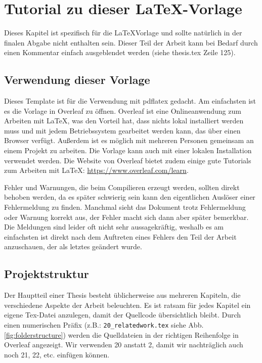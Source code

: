 \chapter{Tutorial zu dieser LaTeX-Vorlage}
Dieses Kapitel ist spezifisch für die \LaTeX Vorlage und sollte natürlich in der finalen Abgabe nicht enthalten sein.
Dieser Teil der Arbeit kann bei Bedarf durch einen Kommentar einfach ausgeblendet werden (siehe thesis.tex Zeile 125).






\section{Verwendung dieser Vorlage}
Dieses Template ist für die Verwendung mit pdflatex gedacht. Am einfachsten ist es die Vorlage in Overleaf \cite{overleaf} zu öffnen. Overleaf ist eine Onlineanwendung zum Arbeiten mit \LaTeX{}, was den Vorteil hat, dass nichts lokal installiert werden muss und mit jedem Betriebssystem gearbeitet werden kann, das über einen Browser verfügt. Außerdem ist es möglich mit mehreren Personen gemeinsam an einem Projekt zu arbeiten. Die Vorlage kann auch mit einer lokalen Installation verwendet werden. Die Website von Overleaf bietet zudem einige gute Tutorials zum Arbeiten mit \LaTeX{}: \url{https://www.overleaf.com/learn}.

Fehler und Warnungen, die beim Compilieren erzeugt werden, sollten direkt behoben werden, da es später schwierig sein kann den eigentlichen Auslöser einer Fehlermeldung zu finden. Manchmal sieht das Dokument trotz Fehlermeldung oder Warnung korrekt aus, der Fehler macht sich dann aber später bemerkbar. Die Meldungen sind leider oft nicht sehr aussagekräftig, weshalb es am einfachsten ist direkt nach dem Auftreten eines Fehlers den Teil der Arbeit anzuschauen, der als letztes geändert wurde.

\section{Projektstruktur}

Der Hauptteil einer Thesis besteht üblicherweise aus mehreren Kapiteln, die verschiedene Aspekte der Arbeit beleuchten. 
Es ist ratsam für jedes Kapitel ein eigene Tex-Datei anzulegen, damit der Quellcode übersichtlich bleibt. Durch einen numerischen Präfix (z.B.: \texttt{20\_relatedwork.tex} siehe Abb. \ref{fig:folderstructure}) werden die Quelldateien in der richtigen Reihenfolge in Overleaf angezeigt. Wir verwenden 20 anstatt 2, damit wir nachträglich auch noch 21, 22, etc. einfügen können.

